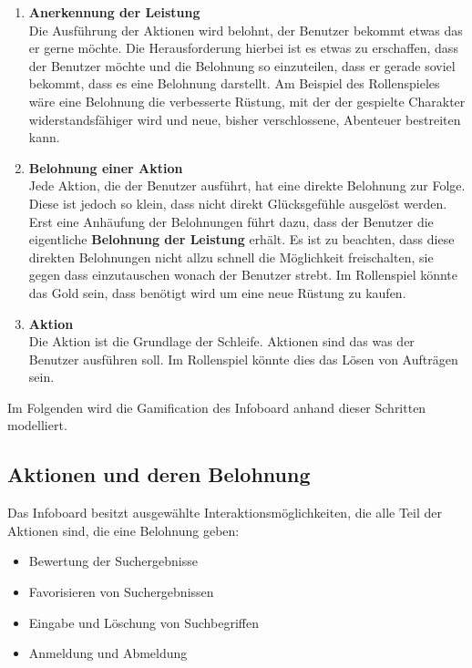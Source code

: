\documentclass[12pt,twoside]{book}
\begin{document}
\begin{enumerate}
  \item \textbf{Anerkennung der Leistung} \\
  Die Ausführung der Aktionen wird belohnt, der Benutzer bekommt etwas das er gerne möchte. Die Herausforderung hierbei ist es etwas zu erschaffen, dass der Benutzer möchte und die Belohnung so einzuteilen, dass er gerade soviel bekommt, dass es eine Belohnung darstellt. Am Beispiel des Rollenspieles wäre eine Belohnung die verbesserte Rüstung, mit der der gespielte Charakter widerstandsfähiger wird und neue, bisher verschlossene, Abenteuer bestreiten kann.
  \item \textbf{Belohnung einer Aktion}\\
  Jede Aktion, die der Benutzer ausführt, hat eine direkte Belohnung zur Folge. Diese ist jedoch so klein, dass nicht direkt Glücksgefühle ausgelöst werden. Erst eine Anhäufung der Belohnungen führt dazu, dass der Benutzer die eigentliche \textbf{Belohnung der Leistung} erhält. Es ist zu beachten, dass diese direkten Belohnungen nicht allzu schnell die Möglichkeit freischalten, sie gegen dass einzutauschen wonach der Benutzer strebt. Im Rollenspiel könnte das Gold sein, dass benötigt wird um eine neue Rüstung zu kaufen.
  \item \textbf{Aktion}\\
  Die Aktion ist die Grundlage der Schleife. Aktionen sind das was der Benutzer ausführen soll. Im Rollenspiel könnte dies das Lösen von Aufträgen sein.
\end{enumerate}

Im Folgenden wird die Gamification des Infoboard anhand dieser Schritten modelliert.

\subsection{Aktionen und deren Belohnung}

Das Infoboard besitzt ausgewählte Interaktionsmöglichkeiten, die alle Teil der Aktionen sind, die eine Belohnung geben:

\begin{itemize}
  \item Bewertung der Suchergebnisse
  \item Favorisieren von Suchergebnissen
  \item Eingabe und Löschung von Suchbegriffen
  \item Anmeldung und Abmeldung
\end{itemize}
\end{document}
